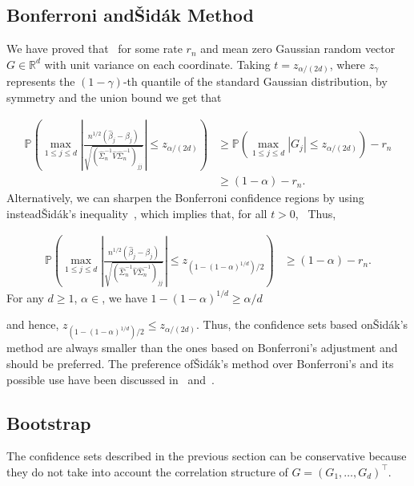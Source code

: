 \documentclass{article}
\begin{document}
 \subsection{Bonferroni and{\v{S}}id{\'a}k Method}\label{subsec:bonferroni.sidak}
 
 We have proved that
 \
 for some rate $r_n$ and mean zero Gaussian random vector $G\in\mathbb{R}^d$ with unit variance on each coordinate. Taking $t = z_{\alpha/(2d)}$, where $z_{\gamma}$ represents the $(1-\gamma)$-th quantile of the standard Gaussian distribution, by symmetry and the union bound we get that
 
 
 
 
 
 \begin{align*}
 \mathbb{P}\left(\max_{1\le j\le d}\left|\frac{n^{1/2}(\widehat{\beta}_j - \beta_j)}{\sqrt{(\widehat{\Sigma}_n^{-1}\widehat{V}\widehat{\Sigma}_n^{-1})_{jj}}}\right| \le z_{\alpha/(2d)}\right) &\ge \mathbb{P}\left(\max_{1\le j\le d}|G_j| \le z_{\alpha/(2d)}\right) - r_n\\
 &\ge (1 - \alpha) - r_n.
 \end{align*}
 Alternatively, we can sharpen the Bonferroni confidence regions by using instead{\v{S}}id{\'a}k's inequality~\citep{vsidak1967rectangular}, which implies that, for all $t > 0$,
 \
 Thus,
 
 
 \begin{align*}
 \mathbb{P}\left(\max_{1\le j\le d}\left|\frac{n^{1/2}(\widehat{\beta}_j - \beta_j)}{\sqrt{(\widehat{\Sigma}_n^{-1}\widehat{V}\widehat{\Sigma}_n^{-1})_{jj}}}\right| \le z_{(1 - (1-\alpha)^{1/d})/2}\right) &\ge (1 - \alpha) - r_n.
 \end{align*}
 For any $d \ge 1$, $\alpha\in$, we have $1 - (1 - \alpha)^{1/d} \ge \alpha/d$
 
 and hence, $z_{(1- (1-\alpha)^{1/d})/2} \le z_{\alpha/(2d)}$. Thus, the confidence sets based on{\v{S}}id{\'a}k's method are always smaller than the ones based on Bonferroni's adjustment and should be preferred. 
 The preference of{\v{S}}id{\'a}k's method over Bonferroni's and its possible use have been discussed in~\cite{westfall1993resampling} and~\cite{drton2004model}.
 
 \subsection{Bootstrap}
 The confidence sets described in the previous section can be conservative because they do not take into account the correlation structure of $G = (G_1, \ldots, G_d)^{\top}$.  
 
\end{document}
